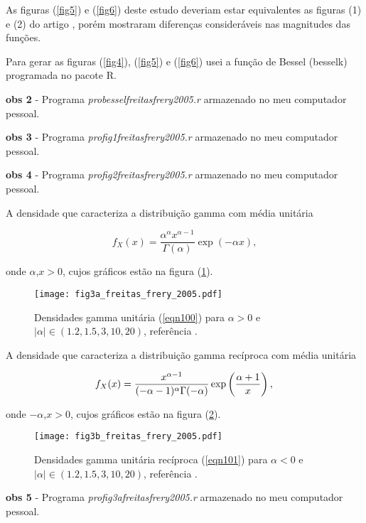 	
As figuras (\ref{fig5}) e (\ref{fig6}) deste estudo deveriam estar equivalentes as figuras (1) e (2) do artigo \cite{ffc}, porém mostraram diferenças consideráveis nas magnitudes das funções. 

Para gerar as figuras (\ref{fig4}), (\ref{fig5}) e (\ref{fig6}) usei a função de Bessel (besselk) programada no pacote R.

{\bf obs 2} - Programa {\it probesselfreitasfrery2005.r} armazenado no meu computador pessoal.

{\bf obs 3} - Programa {\it profig1freitasfrery2005.r} armazenado no meu computador pessoal.

{\bf obs 4} - Programa {\it profig2freitasfrery2005.r} armazenado no meu computador pessoal.

A densidade que caracteriza a distribuição gamma com média unitária

\begin{equation}\label{eqn100}
	f_{X}(x)=\frac{\alpha^{\alpha}x^{\alpha-1}}{\Gamma(\alpha)}\exp\left(-\alpha x\right), 
\end{equation}

onde $\alpha$,$x>0$, cujos gráficos estão na figura (\ref{fig7}).

\begin{figure}[!htb]
\centering
\texttt{[image: fig3a\_freitas\_frery\_2005.pdf]}
	\caption{Densidades  gamma unitária (\ref{eqn100}) para $\alpha > 0$ e $|\alpha|\in(1.2,1.5,3,10,20)$, referência \cite{ffc} .}
\label{fig7}
\end{figure}


A densidade que caracteriza a distribuição gamma recíproca com média unitária

\begin{equation}\label{eqn101}
	f_{X}(x)=\frac{x^{\alpha-1}}{(-\alpha-1)^{\alpha}\Gamma(-\alpha)}\exp\left(\frac{\alpha+1}{x}\right), \\
\end{equation}

onde $-\alpha$,$x>0$, cujos gráficos estão na figura (\ref{fig8}).

\begin{figure}[!htb]
\centering
\texttt{[image: fig3b\_freitas\_frery\_2005.pdf]}
	\caption{Densidades gamma unitária recíproca (\ref{eqn101}) para $\alpha < 0$ e $|\alpha|\in(1.2,1.5,3,10,20)$, referência \cite{ffc} .}
\label{fig8}
\end{figure}

{\bf obs 5} - Programa {\it profig3afreitasfrery2005.r} armazenado no meu computador pessoal.

